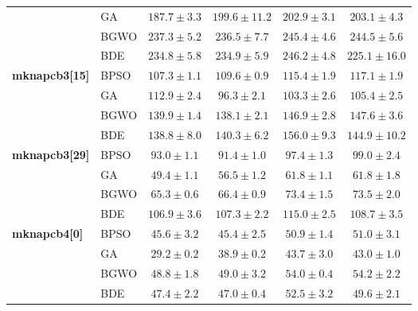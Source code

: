 \begin{table}[htbp]
\begin{tabular*}{\textwidth}{@{\extracolsep{\fill}}llcccc@{}}
                       & GA    & $\mathbf{187.7 \pm 3.3}$ &         $199.6 \pm 11.2$ &          $202.9 \pm 3.1$ &          $203.1 \pm 4.3$ \\
                       & BGWO  &          $237.3 \pm 5.2$ & $\mathbf{236.5 \pm 7.7}$ &          $245.4 \pm 4.6$ &          $244.5 \pm 5.6$ \\
                       & BDE   &          $234.8 \pm 5.8$ &          $234.9 \pm 5.9$ &          $246.2 \pm 4.8$ & $\mathbf{225.1 \pm 16.0}$ \\
    \midrule
    \textbf{mknapcb3[15]} & BPSO  & $\mathbf{107.3 \pm 1.1}$ &          $109.6 \pm 0.9$ &          $115.4 \pm 1.9$ &          $117.1 \pm 1.9$ \\
                       & GA    &          $112.9 \pm 2.4$ &  $\mathbf{96.3 \pm 2.1}$ &          $103.3 \pm 2.6$ &          $105.4 \pm 2.5$ \\
                       & BGWO  &          $139.9 \pm 1.4$ & $\mathbf{138.1 \pm 2.1}$ &          $146.9 \pm 2.8$ &          $147.6 \pm 3.6$ \\
                       & BDE   & $\mathbf{138.8 \pm 8.0}$ &          $140.3 \pm 6.2$ &          $156.0 \pm 9.3$ &         $144.9 \pm 10.2$ \\
    \midrule
    \textbf{mknapcb3[29]} & BPSO  &           $93.0 \pm 1.1$ &  $\mathbf{91.4 \pm 1.0}$ &           $97.4 \pm 1.3$ &           $99.0 \pm 2.4$ \\
                       & GA    &  $\mathbf{49.4 \pm 1.1}$ &           $56.5 \pm 1.2$ &           $61.8 \pm 1.1$ &           $61.8 \pm 1.8$ \\
                       & BGWO  &  $\mathbf{65.3 \pm 0.6}$ &           $66.4 \pm 0.9$ &           $73.4 \pm 1.5$ &           $73.5 \pm 2.0$ \\
                       & BDE   & $\mathbf{106.9 \pm 3.6}$ &          $107.3 \pm 2.2$ &          $115.0 \pm 2.5$ &          $108.7 \pm 3.5$ \\
    \midrule
    \textbf{mknapcb4[0]} & BPSO  &           $45.6 \pm 3.2$ &  $\mathbf{45.4 \pm 2.5}$ &           $50.9 \pm 1.4$ &           $51.0 \pm 3.1$ \\
                       & GA    &  $\mathbf{29.2 \pm 0.2}$ &           $38.9 \pm 0.2$ &           $43.7 \pm 3.0$ &           $43.0 \pm 1.0$ \\
                       & BGWO  &  $\mathbf{48.8 \pm 1.8}$ &           $49.0 \pm 3.2$ &           $54.0 \pm 0.4$ &           $54.2 \pm 2.2$ \\
                       & BDE   &           $47.4 \pm 2.2$ &  $\mathbf{47.0 \pm 0.4}$ &           $52.5 \pm 3.2$ &           $49.6 \pm 2.1$ \\

\end{tabular*}
\end{table}
